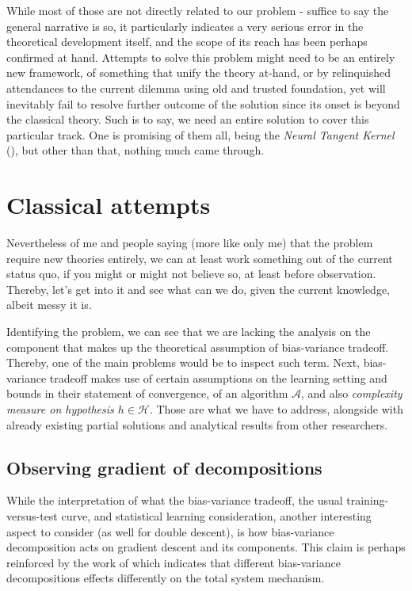 \documentclass[10pt]{article}
\begin{document}
While most of those are not directly related to our problem - suffice to say the general narrative is so, it particularly indicates a very serious error in the theoretical development itself, and the scope of its reach has been perhaps confirmed at hand. Attempts to solve this problem might need to be an entirely new framework, of something that unify the theory at-hand, or by relinquished attendances to the current dilemma using old and trusted foundation, yet will inevitably fail to resolve further outcome of the solution since its onset is beyond the classical theory. Such is to say, we need an entire solution to cover this particular track. One is promising of them all, being the \textit{Neural Tangent Kernel} (\cite{Jacot:2018:NTK}), but other than that, nothing much came through. 

\section{Classical attempts}

Nevertheless of me and people saying (more like only me) that the problem require new theories entirely, we can at least work something out of the current status quo, if you might or might not believe so, at least before observation. Thereby, let's get into it and see what can we do, given the current knowledge, albeit messy it is. 

Identifying the problem, we can see that we are lacking the analysis on the component that makes up the theoretical assumption of bias-variance tradeoff. Thereby, one of the main problems would be to inspect such term. Next, bias-variance tradeoff makes use of certain assumptions on the learning setting and bounds in their statement of convergence, of an algorithm $\mathcal{A}$, and also \textit{complexity measure on hypothesis $h\in\mathcal{H}$}. Those are what we have to address, alongside with already existing partial solutions and analytical results from other researchers. 

\subsection{Observing gradient of decompositions}

While the interpretation of what the bias-variance tradeoff, the usual training-versus-test curve, and statistical learning consideration, another interesting aspect to consider (as well for double descent), is how bias-variance decomposition acts on gradient descent and its components. This claim is perhaps reinforced by the work of \cite{adlam2020understandingdoubledescentrequires} which indicates that different bias-variance decompositions effects differently on the total system mechanism. 
\end{document}
